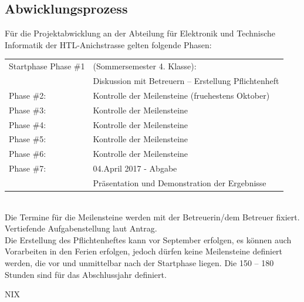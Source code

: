\documentclass[12pt,a4paper]{article}
\newcommand{\yhbu}[0]{\color{ydkbu}}	%
\newcommand{\korr}[0]{\color{corrclr}\fontsize{8pt}{9pt}\selectfont\bf} %
\begin{document}
{ \subsection{Abwicklungsprozess}{\yhbu
	Für die Projektabwicklung an der
	Abteilung für Elektronik und Technische Informatik der HTL-Anichstrasse
	gelten folgende Phasen:
	\\[4mm]\hspace*{-3mm}
	\begin{tabular}{p{50mm} l}
	Startphase Phase \#1
			&(Sommersemester 4. Klasse):	\\
			&Diskussion mit Betreuern -- Erstellung Pflichtenheft	\\
	Phase \#2:	&Kontrolle der Meilensteine (fruehestens Oktober)	\\
	Phase \#3:	&Kontrolle der Meilensteine	\\
	Phase \#4:	&Kontrolle der Meilensteine	\\
	Phase \#5:	&Kontrolle der Meilensteine	\\
	Phase \#6:	&Kontrolle der Meilensteine	\\
	Phase \#7:	&04.April 2017 - Abgabe		\\
			&Präsentation und Demonstration der Ergebnisse
	\end{tabular}\hfill
	\\[4mm]
	Die Termine für die Meilensteine werden mit der Betreuerin\slash{}dem Betreuer fixiert.
	\\[2mm]
	Vertiefende Aufgabenstellung laut Antrag.
	\\[2mm]
	Die Erstellung des Pflichtenheftes kann vor September erfolgen, es können auch
	Vorarbeiten in den Ferien erfolgen, jedoch dürfen keine Meilensteine definiert
	werden, die vor und unmittelbar nach der Startphase liegen. Die 150 – 180 Stunden
	sind für das Abschlussjahr definiert.
	}







\clearpage\vfill\newpage
	\vfill
	{\color{white} NIX}




\clearpage\vfill\newpage
}
\end{document}
